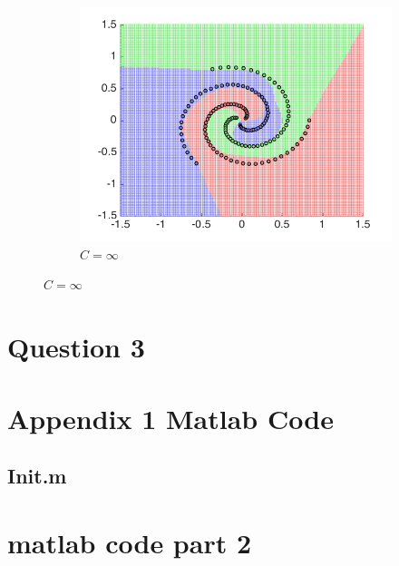 \documentclass[10pt,twocolumn,letterpaper]{article}
\begin{document}
\begin{figure}
\begin{subfigure}[H]{0.3 \columnwidth}
		\includegraphics[width = 1\columnwidth]{q2_ovr_Cinf}
		\caption{$C = \infty$}
	\end{subfigure}
\end{figure}


\section{Question 3}




{\small


}

\onecolumn
\appendix
\section{Appendix 1 Matlab Code}
\subsection{Init.m}


\section{matlab code part 2}

\end{document}
